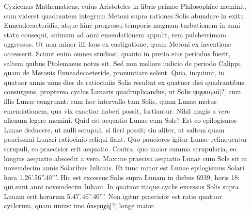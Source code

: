  Cyzicenus Mathematicus,
cuius Aristoteles in libris primae Philosophiae meminit,
cum videret quadrantem integrum Metoni supra rationes Solis
abundare in exitu Enneadecaeteridis, atque hinc progressu temporis
magnam turbationem in anni statu consequi, animum ad anni emendationem
appulit, rem pulcherrimam aggressus.
Ut non minor illi
laus ex castigatione, quam Metoni ex inventione accesserit.
Sciunt enim
omnes studiosi, quanto in pretio eius periodus fuerit, saltem quibus
Ptolemaeus notus sit.
Sed non meliore iudicio de periodo Calippi,
quam de Metonis Enneadecaeteride, pronuntiare solent.
Quia, inquiunt,
in quatuor annis unus dies de ratiociniis Solis resultat ex quatuor
diei quadrantibus consurgens, propterea cyclus Lunaris quadruplicandus,
ut Solis \textgreek{ψηφισμοὶ[?]} cum illis Lunae congruant: cum hoc
intervallo tam Solis, quam Lunae motus emendationem, qua vix exactior
haberi possit, fortiantur.
Nihil magis a vero alienum legere
memini.
Quid est aequatio Lunae cum Sole?
Est eo epilogismos Lunae
deducere, ut nulli scrupuli, si fieri possit; sin aliter, ut saltem quam
paucissimi Lunari ratiocinio reliqui fiant.
Quo pauciores igitur
Lunae relinquentur scrupuli, eo praecisior erit aequatio.
Contra, quo
maior summa scrupularia, eo longius aequatio abscedit a vero.
Maxime
praecisa aequatio Lunae cum Sole sit in novemdecim annis Solaribus
Iulianis.
Et tunc minor est Lunae epilogismus Solari hora 1.26'.56''.40'''.
Hic est excessus Solis supra Lunam in diebus 6939, horis 18:
qui sunt anni novemdecim Iuliani.
In quatuor itaque cyclis excessus
Solis supra Lunam erit horarum 5.47'.46''.40'''.
Non igitur praecisior
est ratio quatuor cyclorum, quam unius: imo \textgreek{ὑπεροχὴ[?]} longe maior.

